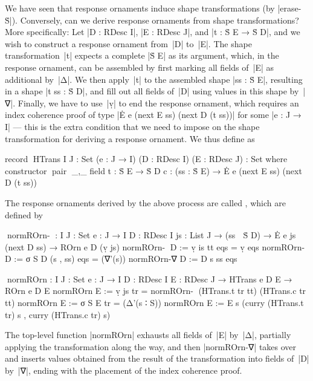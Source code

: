 We have seen that response ornaments induce shape transformations (by |erase-Ṡ|).
Conversely, can we derive response ornaments from shape transformations?
More specifically: Let |D : RDesc I|, |E : RDesc J|, and |t : Ṡ E → Ṡ D|, and we wish to construct a response ornament from~|D| to~|E|.
The shape transformation~|t| expects a complete |Ṡ E| as its argument, which, in the response ornament, can be assembled by first marking all fields of~|E| as additional by~|Δ|.
We then apply~|t| to the assembled shape |ss : Ṡ E|, resulting in a shape |t ss : Ṡ D|, and fill out all fields of~|D| using values in this shape by~|∇|.
Finally, we have to use~|ṿ| to end the response ornament, which requires an index coherence proof of type |Ė e (next E ss) (next D (t ss))| for some |e : J → I| --- this is the extra condition that we need to impose on the shape transformation for deriving a response ornament.
We thus define  as
\begin{code}
record ^^^HTrans {I J : Set} (e : J → I) (D : RDesc I) (E : RDesc J) : Set
  where
    constructor ^^^pair ^^^_,_
    field
      t  : Ṡ E → Ṡ D
      c  : (ss : Ṡ E) → Ė e (next E ss) (next D (t ss))
\end{code}
The response ornaments derived by the above process are called , which are defined by
\begin{code}
^^^normROrn-∇ :  {I J : Set} {e : J → I} {D : RDesc I} {js : List J} →
                 (ss ∶ Ṡ D) → Ė e js (next D ss) → ROrn e D (ṿ js)
normROrn-∇ {D := ṿ is   } tt        eqs = ṿ eqs
normROrn-∇ {D := σ S D  } (s , ss)  eqs = (∇'(s)) normROrn-∇ {D := D s} ss eqs

^^^normROrn :  {I J : Set} {e : J → I} {D : RDesc I} {E : RDesc J} →
               HTrans e D E → ROrn e D E
normROrn {E := ṿ js   } tr = normROrn-∇ (HTrans.t tr tt) (HTrans.c tr tt)
normROrn {E := σ S E  } tr =
  (Δ'(s ∶ S)) normROrn {E := E s} (curry (HTrans.t tr) s , curry (HTrans.c tr) s)
\end{code}
The top-level function |normROrn| exhausts all fields of~|E| by~|Δ|, partially applying the transformation along the way, and then |normROrn-∇| takes over and inserts values obtained from the result of the transformation into fields of~|D| by~|∇|, ending with the placement of the index coherence proof.

